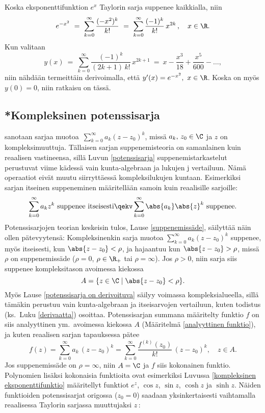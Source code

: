 \ratk Koska eksponenttifunktion $e^x$ Taylorin sarja suppenee kaikkialla, niin
\[ 
e^{-x^2}\ =\ \sum_{k=0}^\infty \frac{(-x^2)^k}{k!}\ 
          =\ \sum_{k=0}^\infty \frac{(-1)^k}{k!}\,x^{2k}\,, \quad x \in \R. 
\]
Kun valitaan
\[ 
y(x)\ =\ \sum_{k=0}^\infty \frac{(-1)^k}{(2k+1)\,k!}\,x^{2k+1}\ 
      =\ x - \frac{x^3}{18} + \frac{x^5}{600} - \ldots, 
\]
niin nähdään termeittäin derivoimalla, että $y'(x)=e^{-x^2},\ x\in\R$. Koska on myös $y(0)=0$,
niin ratkaisu on tässä. \loppu

\subsection{*Kompleksinen potenssisarja}

 sanotaan sarjaa muotoa 
$\,\sum_{k=0}^\infty a_k (z-z_0)^k$, missä $a_k,\,z_0 \in \C$ ja $z$ on kompleksimuuttuja. 
Tällaisen sarjan suppenemisteoria on samanlainen kuin reaalisen vastineensa, sillä Luvun 
\ref{potenssisarja} suppenemistarkastelut perustuvat viime kädessä vain kunta-algebraan ja 
lukujen \pain{itseisarvo}j\pain{en} vertailuun. Nämä operaatiot eivät muutu siirryttäessä 
kompleksilukujen kuntaan. Esimerkiksi sarjan itseinen suppeneminen määritellään samoin kuin 
reaalisille sarjoille:
\[ 
\sum_{k=0}^\infty a_k z^k\ \text{suppenee itseisesti} 
              \qekv \sum_{k=0}^\infty \abs{a_k}\abs{z}^k\ \text{suppenee}. 
\]
Potenssisarjojen teorian keskeisin tulos, Lause \ref{suppenemissäde}, säilyttää näin ollen 
pätevyytensä: Kompleksinenkin sarja muotoa $\sum_{k=0}^\infty a_k (z-z_0)^k$ suppenee, myös 
itseisesti, kun $\abs{z-z_0}<\rho$, ja hajaantuu kun $\abs{z-z_0}>\rho$, missä $\rho$ on 
suppenemissäde ($\rho=0$, $\rho \in \R_+$ tai $\rho=\infty$). Jos $\rho>0$, niin sarja siis 
suppenee kompleksitason avoimessa kiekossa
\[ 
A = \{z \in \C \mid \abs{z-z_0} < \rho\}. 
\]
Myös Lause \ref{potenssisarja on derivoituva} säilyy voimassa kompleksialueella, sillä tämäkin
perustuu vain kunta-algebraan ja itseisarvojen vertailuun, kuten todistus 
(ks.\ Luku \ref{derivaatta}) osoittaa. Potenssisarjan summana määritelty funktio $f$
on siis analyyttinen ym.\ avoimessa kiekossa $A$ (Määritelmä \ref{analyyttinen funktio}), ja
kuten reaalisen sarjan tapauksessa pätee
\[
f(z) = \sum_{k=0}^\infty a_k\,(z-z_0)^k 
     = \sum_{k=0}^\infty \dfrac{f^{(k)}(z_0)}{k!}\,(z-z_0)^k, \quad z \in A.
\]
Jos suppenemissäde on $\rho=\infty$, niin $A=\C$ ja $f$ siis kokonainen funktio. Polynomien
lisäksi kokonaisia funktioita ovat esimerkiksi Luvussa \ref{kompleksinen eksponenttifunktio}
määritellyt funktiot $e^z$, $\cos z$, $\sin z$, $\cosh z$ ja $\sinh z$. Näiden funktioiden
potenssisarjat origossa ($z_0=0$) saadaan yksinkertaisesti vaihtamalla reaalisessa Taylorin
sarjassa muuttujaksi $z\,$:

